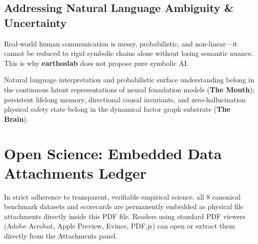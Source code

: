 \documentclass[11pt,a4paper]{article}
\begin{document}
\subsection{Addressing Natural Language Ambiguity \& Uncertainty}
Real-world human communication is messy, probabilistic, and non-linear---it cannot be reduced to rigid symbolic chains alone without losing semantic nuance. This is why \textbf{earthoslab} does not propose pure symbolic AI.

Natural language interpretation and probabilistic surface understanding belong in the continuous latent representations of neural foundation models (\textbf{The Mouth}); persistent lifelong memory, directional causal invariants, and zero-hallucination physical safety state belong in the dynamical factor graph substrate (\textbf{The Brain}).

\vspace{0.8em}

\enlargethispage{7.0\baselineskip}
\section{Open Science: Embedded Data Attachments Ledger}

In strict adherence to transparent, verifiable empirical science, all 8 canonical benchmark datasets and scorecards are permanently embedded as physical file attachments directly inside this PDF file. Readers using standard PDF viewers (Adobe Acrobat, Apple Preview, Evince, PDF.js) can open or extract them directly from the Attachments panel.
\end{document}
